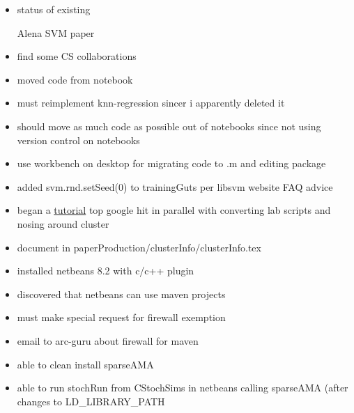 \documentclass[hyperref]{labbook}
\begin{document}



\begin{itemize}
\item status of existing
  \begin{description}
  \item[Alena SVM paper] 
  \end{description}
\item find some CS collaborations
\end{itemize}



\begin{itemize}
\item moved code from notebook
\end{itemize}


\begin{itemize}
\item must reimplement knn-regression  sincer i apparently deleted it
\item should move as much code as possible out of notebooks since not using version control on notebooks
\item use workbench on desktop for migrating code to .m and editing package
\end{itemize}

\begin{itemize}
\item added svm.rnd.setSeed(0) to trainingGuts per libsvm website FAQ advice
\end{itemize}

\begin{itemize}
\item began a \href{http://www.ceci-hpc.be/slurm_tutorial.html}{tutorial} top google hit in parallel with converting lab scripts and nosing around cluster
\item document in paperProduction/clusterInfo/clusterInfo.tex

\end{itemize}

\begin{itemize}
\item installed netbeans 8.2 with c/c++ plugin
\item discovered that netbeans can use maven projects
\item must make special request for firewall exemption
\item email to arc-guru about firewall for maven
\item able to clean install sparseAMA
\item able to run stochRun from CStochSims in netbeans calling sparseAMA (after changes to LD\_LIBRARY\_PATH
\end{itemize}
\end{document}
